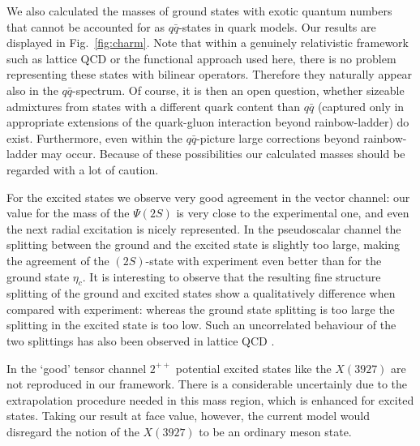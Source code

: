 We also calculated the masses of ground states with exotic quantum numbers that cannot 
be accounted for as $q\bar{q}$-states in quark models. Our results are displayed in 
Fig.~\ref{fig:charm}. Note that within a genuinely relativistic framework such as 
lattice QCD or the functional approach used here, there is no problem representing these 
states with bilinear operators. Therefore they naturally appear also in the 
$q\bar{q}$-spectrum. Of course, it is then an open question, whether sizeable admixtures 
from states with a different quark content than $q\bar{q}$ (captured only in appropriate 
extensions of the quark-gluon interaction beyond rainbow-ladder) do exist. Furthermore,
even within the $q\bar{q}$-picture large corrections beyond rainbow-ladder may occur.
Because of these possibilities our calculated masses should be regarded with a lot of 
caution. 

For the excited states we observe very good agreement in the vector channel: our
value for the mass of the $\Psi(2S)$ is very close to the experimental one, and even
the next radial excitation is nicely represented. In the pseudoscalar channel the 
splitting between the ground and the excited state is slightly too large, making the 
agreement of the $(2S)$-state with experiment even better than for the ground state
$\eta_c$. It is interesting to observe that the resulting fine structure splitting of 
the ground and excited states show a qualitatively difference when compared with 
experiment: whereas the ground state splitting is too large the splitting in the 
excited state is too low. Such an uncorrelated behaviour of the two splittings has
also been observed in lattice QCD \cite{Bali:2011rd}.

In the `good' tensor channel $2^{++}$ potential excited states like
the $X(3927)$ are not reproduced in our framework. There is a considerable uncertainly 
due to the extrapolation procedure needed in this mass region, which is enhanced for
excited states. Taking our result at face value, however, the current model would disregard 
the notion of the $X(3927)$ to be an ordinary meson state.

